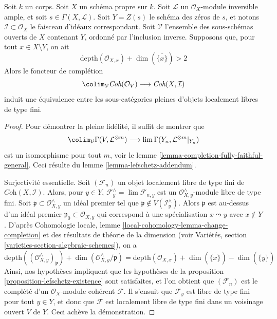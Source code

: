 \begin{proposition}
\label{proposition-lefschetz-equivalence}
Soit $k$ un corps. Soit $X$ un schéma propre sur $k$.
Soit $\mathcal{L}$ un $\mathcal{O}_X$-module inversible ample,
et soit $s \in \Gamma(X, \mathcal{L})$. Soit $Y = Z(s)$
le schéma des zéros de $s$, et notons $\mathcal{I} \subset \mathcal{O}_X$
le faisceau d'idéaux correspondant.
Soit $\mathcal{V}$ l'ensemble des sous-schémas ouverts de $X$ contenant $Y$,
ordonné par l'inclusion inverse.
Supposons que, pour tout $x \in X \setminus Y$, on ait
$$
\text{depth}(\mathcal{O}_{X, x}) + \dim(\overline{\{x\}}) > 2
$$
Alors le foncteur de complétion
$$
\colim_\mathcal{V}
\textit{Coh}(\mathcal{O}_V)
\longrightarrow
\textit{Coh}(X, \mathcal{I})
$$
induit une équivalence entre les sous-catégories pleines d'objets localement libres de type fini.
\end{proposition}

\begin{proof}
Pour démontrer la pleine fidélité, il suffit de montrer que
$$
\colim_\mathcal{V} \Gamma(V, \mathcal{L}^{\otimes m})
\longrightarrow
\lim \Gamma(Y_n, \mathcal{L}^{\otimes m}|_{Y_n})
$$
est un isomorphisme pour tout $m$, voir le
lemme \ref{lemma-completion-fully-faithful-general}.
Ceci résulte du lemme \ref{lemma-lefschetz-addendum}.

\medskip\noindent
Surjectivité essentielle. Soit $(\mathcal{F}_n)$ un objet localement
libre de type fini de $\textit{Coh}(X, \mathcal{I})$. Alors, pour $y \in Y$,
$\mathcal{F}_y^\wedge = \lim \mathcal{F}_{n, y}$
est un $\mathcal{O}_{X, y}^\wedge$-module libre de type fini.
Soit $\mathfrak p \subset \mathcal{O}_{X, y}^\wedge$
un idéal premier tel que $\mathfrak p \not \in V(\mathcal{I}_y^\wedge)$.
Alors $\mathfrak p$ est au-dessus d'un idéal premier $\mathfrak p_0 \subset \mathcal{O}_{X, y}$
qui correspond à une spécialisation $x \leadsto y$ avec
$x \not \in Y$. D'après Cohomologie locale, lemme
\ref{local-cohomology-lemma-change-completion}
et des résultats de théorie de la dimension
(voir Variétés, section \ref{varieties-section-algebraic-schemes}),
on a
$$
\text{depth}((\mathcal{O}_{X, y}^\wedge)_\mathfrak p) +
\dim(\mathcal{O}_{X, y}^\wedge/\mathfrak p) =
\text{depth}(\mathcal{O}_{X, x}) +
\dim(\overline{\{x\}}) - \dim(\overline{\{y\}})
$$
Ainsi, nos hypothèses impliquent que les hypothèses de la
proposition \ref{proposition-lefschetz-existence}
sont satisfaites, et l'on obtient que $(\mathcal{F}_n)$
est le complété d'un $\mathcal{O}_X$-module cohérent $\mathcal{F}$.
Il s'ensuit que $\mathcal{F}_y$ est libre de type fini pour tout $y \in Y$,
et donc que $\mathcal{F}$ est localement libre de type fini dans un
voisinage ouvert $V$ de $Y$. Ceci achève la démonstration.
\end{proof}















